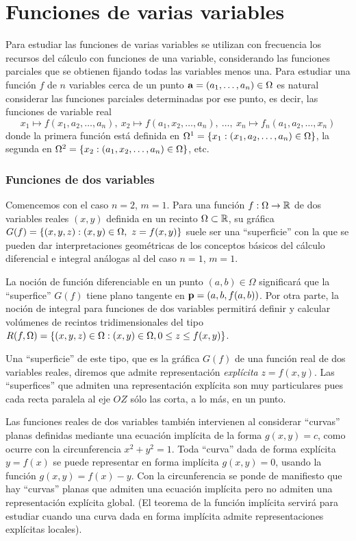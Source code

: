 \section{Funciones de varias variables}

Para estudiar las funciones de varias variables se utilizan con frecuencia los recursos del cálculo con funciones de una variable, considerando las funciones parciales que se obtienen fijando todas las variables menos una. Para estudiar una función $f$ de $n$ variables cerca de un punto $\mathbf{a}=(a_1,\dots,a_n)\in\Omega$ es natural considerar las funciones parciales determinadas por ese punto, es decir, las funciones de variable real
$$x_1\mapsto f(x_1,a_2,\dots,a_n), \ x_2\mapsto f(a_1,x_2,\dots,a_n), \ \dots, \ x_n\mapsto f_n(a_1,a_2,\dots,x_n)$$
donde la primera función está definida en $\Omega^1=\left\lbrace x_1 : (x_1,a_2,\dots,a_n)\in \Omega\right\rbrace$, la segunda en $\Omega^2=\left\lbrace x_2 : (a_1,x_2,\dots,a_n)\in\Omega\right\rbrace$, etc.

\subsubsection*{Funciones de dos variables}
Comencemos con el caso $n=2$, $m=1$. Para una función $f:\Omega\rightarrow\mathbb{R}$ de dos variables reales $(x,y)$ definida en un recinto $\Omega\subset\mathbb{R}$, su gráfica $G(f)=\set{(x,y,z): (x,y)\in\Omega, \ z=f(x,y)}$ suele ser una ``superficie'' con la que se pueden dar interpretaciones geométricas de los conceptos básicos del cálculo diferencial e integral análogas al del caso $n=1$, $m=1$.

La noción de función diferenciable en un punto $(a,b)\in\Omega$ significará que la ``superfice'' $G(f)$ tiene plano tangente en $\mathbf{p}=(a,b,f(a,b))$. Por otra parte, la noción de integral para funciones de dos variables permitirá definir y calcular volúmenes de recintos tridimensionales del tipo $R(f,\Omega)=\left\lbrace(x,y,z)\in\Omega : (x,y)\in\Omega, 0\leq z\leq f(x,y)\right\rbrace$.

Una ``superficie'' de este tipo, que es la gráfica $G(f)$ de una función real de dos variables reales, diremos que admite representación {\it explícita} $z=f(x,y)$. Las ``superfices'' que admiten una representación explícita son muy particulares pues cada recta paralela al eje $OZ$ sólo las corta, a lo más, en un punto.

Las funciones reales de dos variables también intervienen al considerar ``curvas'' planas definidas mediante una ecuación implícita de la forma $g(x,y)=c$, como ocurre con la circunferencia $x^2+y^2=1$. Toda ``curva'' dada de forma explícita $y=f(x)$ se puede representar en forma implícita $g(x,y)=0$, usando la función $g(x,y)=f(x)-y$. Con la circunferencia se ponde de manifiesto que hay ``curvas'' planas que admiten una ecuación implícita pero no admiten una representación explícita global. (El teorema de la función implícita servirá para estudiar cuando una curva dada en forma implícita admite representaciones explícitas locales).

